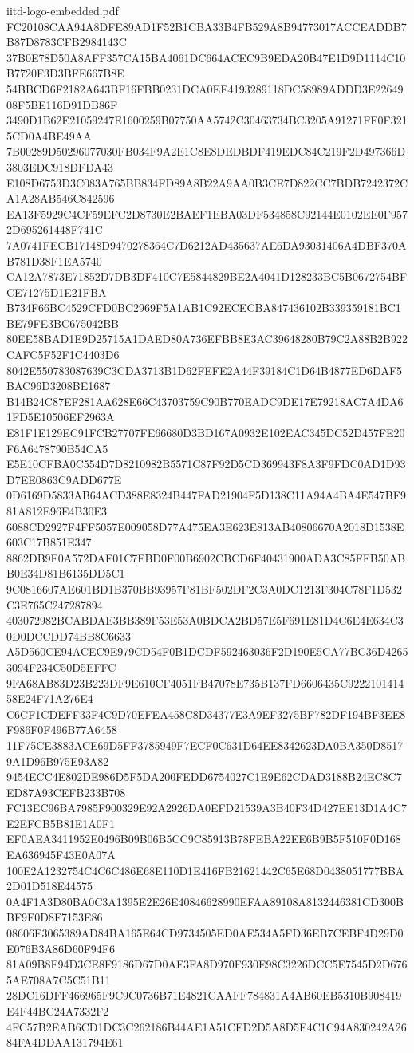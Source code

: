 \begin{filecontents*}[overwrite]{iitd-logo-embedded.pdf}
FC20108CAA94A8DFE89AD1F52B1CBA33B4FB529A8B94773017ACCEADDB7B87D8783CFB2984143C
37B0E78D50A8AFF357CA15BA4061DC664ACEC9B9EDA20B47E1D9D1114C10B7720F3D3BFE667B8E
54BBCD6F2182A643BF16FBB0231DCA0EE4193289118DC58989ADDD3E2264908F5BE116D91DB86F
3490D1B62E21059247E1600259B07750AA5742C30463734BC3205A91271FF0F3215CD0A4BE49AA
7B00289D50296077030FB034F9A2E1C8E8DEDBDF419EDC84C219F2D497366D3803EDC918DFDA43
E108D6753D3C083A765BB834FD89A8B22A9AA0B3CE7D822CC7BDB7242372CA1A28AB546C842596
EA13F5929C4CF59EFC2D8730E2BAEF1EBA03DF534858C92144E0102EE0F9572D695261448F741C
7A0741FECB17148D9470278364C7D6212AD435637AE6DA93031406A4DBF370AB781D38F1EA5740
CA12A7873E71852D7DB3DF410C7E5844829BE2A4041D128233BC5B0672754BFCE71275D1E21FBA
B734F66BC4529CFD0BC2969F5A1AB1C92ECECBA847436102B339359181BC1BE79FE3BC675042BB
80EE58BAD1E9D25715A1DAED80A736EFBB8E3AC39648280B79C2A88B2B922CAFC5F52F1C4403D6
8042E550783087639C3CDA3713B1D62FEFE2A44F39184C1D64B4877ED6DAF5BAC96D3208BE1687
B14B24C87EF281AA628E66C43703759C90B770EADC9DE17E79218AC7A4DA61FD5E10506EF2963A
E81F1E129EC91FCB27707FE66680D3BD167A0932E102EAC345DC52D457FE20F6A6478790B54CA5
E5E10CFBA0C554D7D8210982B5571C87F92D5CD369943F8A3F9FDC0AD1D93D7EE0863C9ADD677E
0D6169D5833AB64ACD388E8324B447FAD21904F5D138C11A94A4BA4E547BF981A812E96E4B30E3
6088CD2927F4FF5057E009058D77A475EA3E623E813AB40806670A2018D1538E603C17B851E347
8862DB9F0A572DAF01C7FBD0F00B6902CBCD6F40431900ADA3C85FFB50ABB0E34D81B6135DD5C1
9C0816607AE601BD1B370BB93957F81BF502DF2C3A0DC1213F304C78F1D532C3E765C247287894
403072982BCABDAE3BB389F53E53A0BDCA2BD57E5F691E81D4C6E4E634C30D0DCCDD74BB8C6633
A5D560CE94ACEC9E979CD54F0B1DCDF592463036F2D190E5CA77BC36D42653094F234C50D5EFFC
9FA68AB83D23B223DF9E610CF4051FB47078E735B137FD6606435C922210141458E24F71A276E4
C6CF1CDEFF33F4C9D70EFEA458C8D34377E3A9EF3275BF782DF194BF3EE8F986F0F496B77A6458
11F75CE3883ACE69D5FF3785949F7ECF0C631D64EE8342623DA0BA350D85179A1D96B975E93A82
9454ECC4E802DE986D5F5DA200FEDD6754027C1E9E62CDAD3188B24EC8C7ED87A93CEFB233B708
FC13EC96BA7985F900329E92A2926DA0EFD21539A3B40F34D427EE13D1A4C7E2EFCB5B81E1A0F1
EF0AEA3411952E0496B09B06B5CC9C85913B78FEBA22EE6B9B5F510F0D168EA636945F43E0A07A
100E2A1232754C4C6C486E68E110D1E416FB21621442C65E68D0438051777BBA2D01D518E44575
0A4F1A3D80BA0C3A1395E2E26E40846628990EFAA89108A8132446381CD300BBF9F0D8F7153E86
08606E3065389AD84BA165E64CD9734505ED0AE534A5FD36EB7CEBF4D29D0E076B3A86D60F94F6
81A09B8F94D3CE8F9186D67D0AF3FA8D970F930E98C3226DCC5E7545D2D6765AE708A7C5C51B11
28DC16DFF466965F9C9C0736B71E4821CAAFF784831A4AB60EB5310B908419E4F44BC24A7332F2
4FC57B2EAB6CD1DC3C262186B44AE1A51CED2D5A8D5E4C1C94A830242A2684FA4DDAA131794E61

\end{filecontents*}
